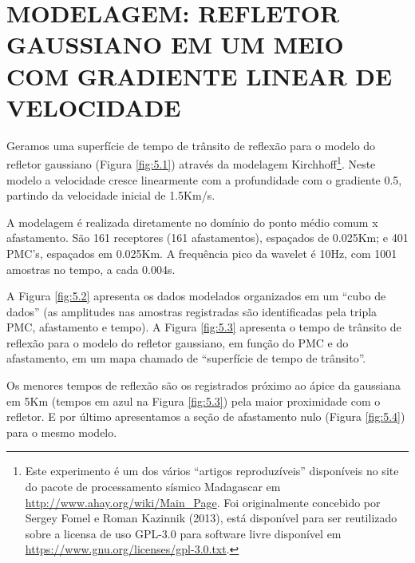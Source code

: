%
% 
% 
% 
% 
% 
% 

\chapter{MODELAGEM: REFLETOR GAUSSIANO EM UM MEIO COM GRADIENTE LINEAR DE VELOCIDADE}
\label{cap5}

Geramos uma superfície de tempo de trânsito de reflexão para o modelo do refletor gaussiano (Figura \ref{fig:5.1})
através da modelagem Kirchhoff\footnote{Este experimento é um dos vários ``artigos reproduzíveis'' disponíveis no site
do pacote de processamento sísmico Madagascar em \url{http://www.ahay.org/wiki/Main_Page}. 
Foi originalmente concebido por Sergey Fomel e Roman Kazinnik (2013),
está disponível para ser reutilizado sobre a licensa de uso GPL-3.0 para software livre disponível
em \url{https://www.gnu.org/licenses/gpl-3.0.txt}.}\cite{fomel1}.
Neste modelo a velocidade cresce linearmente com a profundidade com o gradiente 0.5, partindo da velocidade inicial de
1.5Km/s. 

A modelagem é realizada diretamente no domínio do ponto médio comum x afastamento. São 161 receptores (161 afastamentos),
espaçados de 0.025Km; e 401 PMC's, espaçados em 0.025Km. A frequência pico da wavelet é 10Hz, com 1001 amostras no tempo, a
cada 0.004s.

A Figura \ref{fig:5.2} apresenta os dados modelados organizados em um ``cubo de dados'' (as amplitudes nas amostras registradas
são identificadas pela tripla PMC, afastamento e tempo). A Figura \ref{fig:5.3} apresenta o tempo de trânsito de reflexão para o
modelo do refletor gaussiano, em função do PMC e do afastamento, em um mapa chamado de ``superfície de tempo de trânsito''.

Os menores tempos de reflexão são os registrados próximo ao 
ápice da gaussiana em 5Km (tempos em azul na Figura \ref{fig:5.3}) pela maior proximidade com o refletor.
E por último apresentamos a seção de afastamento nulo (Figura \ref{fig:5.4}) para o mesmo modelo.

